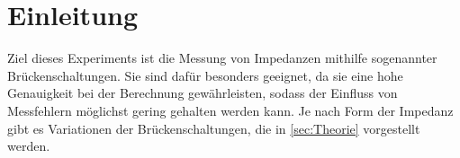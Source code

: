 \section{Einleitung}
\label{sec:Einleitung}
Ziel dieses Experiments ist die Messung von Impedanzen mithilfe sogenannter Brückenschaltungen. 
Sie sind dafür besonders geeignet, da sie eine hohe Genauigkeit bei der Berechnung gewährleisten, sodass der Einfluss 
von Messfehlern möglichst gering gehalten werden kann. 
Je nach Form der Impedanz gibt es Variationen der Brückenschaltungen, die in \ref{sec:Theorie} vorgestellt werden. 
